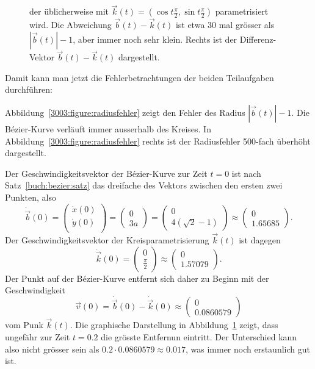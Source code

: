 \begin{loesung}
\begin{figure}
{der üblicherweise mit $\vec{k}(t)=(\cos t\frac{\pi}2,\sin t\frac{\pi}2)$
parametrisiert wird.
Die Abweichung $\vec{b}(t)-\vec{k}(t)$ ist etwa 30 mal grösser als
$|\vec{b}(t)|-1$, aber immer noch sehr klein.
Rechts ist der Differenz-Vektor $\vec{b}(t)-\vec{k}(t)$ dargestellt.
\label{3003:figure:abweichungen}}
\end{figure}
Damit kann man jetzt die Fehlerbetrachtungen der beiden Teilaufgaben
durchführen:
\begin{teilaufgaben}
\item
Abbildung~\ref{3003:figure:radiusfehler} zeigt den Fehler des
Radius $|\vec{b}(t)|-1$.
Die Bézier-Kurve verläuft immer ausserhalb des Kreises.
In Abbildung~\ref{3003:figure:radiusfehler} rechts ist der Radiusfehler
500-fach überhöht dargestellt.
\item
Der Geschwindigkeitsvektor der Bézier-Kurve zur Zeit $t=0$ ist nach
Satz~\ref{buch:bezier:satz} das dreifache des Vektors zwischen den ersten
zwei Punkten, also
\[
\dot{\vec{b}}(0)
=
\begin{pmatrix}
\dot{x}(0)\\
\dot{y}(0)\\
\end{pmatrix}
=
\begin{pmatrix}
0\\
3a
\end{pmatrix}
=
\begin{pmatrix}
0
\\
4(\sqrt{2}-1)
\end{pmatrix}
\approx
\begin{pmatrix}
0
\\
1.65685
\end{pmatrix}.
\]
Der Geschwindigkeitsvektor der Kreisparametrisierung $\vec{k}(t)$ ist
dagegen
\[
\dot{\vec{k}}(0)
=
\begin{pmatrix}
0\\\frac\pi2
\end{pmatrix}
\approx
\begin{pmatrix}
0\\
1.57079
\end{pmatrix}.
\]
Der Punkt auf der Bézier-Kurve entfernt sich daher zu Beginn mit der
Geschwindigkeit
\[
\vec{v}(0)
=
\dot{\vec{b}}(0) - \dot{\vec{k}}(0)
\approx
\begin{pmatrix}
0
\\
0.0860579
\end{pmatrix}
\]
vom Punk $\vec{k}(t)$.
Die graphische Darstellung in Abbildung~\ref{3003:figure:abweichungen}
zeigt, dass ungefähr zur Zeit $t=0.2$ die grösste Entfernun eintritt.
Der Unterschied kann also nicht grösser sein als
$0.2\cdot 0.0860579\approx 0.017$, was immer noch erstaunlich gut ist.
\qedhere
\end{teilaufgaben}
\end{loesung}
